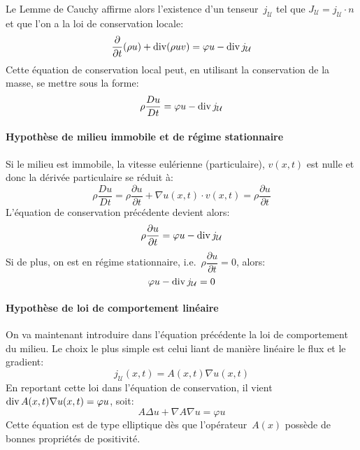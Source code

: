 Le Lemme de Cauchy affirme alors l'existence d'un tenseur~$j_{\mathcal{U}}$ tel que $J_{\mathcal{U}} = j_{\mathcal{U}}\cdot n$ et que l'on a la loi de conservation locale:
\begin{equation}\dfrac\partial{\partial t}(\rho u) + \operatorname{div} (\rho uv) = \varphi u-\operatorname{div} j_{\mathcal{U}}
\end{equation}
Cette équation de conservation local peut, en utilisant la conservation de la masse, se mettre sous la forme:
\begin{equation}
\rho \dfrac{Du}{Dt} = \varphi u-\operatorname{div} j_{\mathcal{U}}
\end{equation}

\medskip
\paragraph{Hypothèse de milieu immobile et de régime stationnaire}
Si le milieu est immobile, la vitesse eulérienne (particulaire), $v(x, t)$ est nulle et donc la dérivée particulaire se réduit à:
\begin{equation}\rho\dfrac{Du}{Dt}=\rho\dfrac{\partial u}{\partial t}+\nabla u(x,t)\cdot v(x,t)=\rho\dfrac{\partial u}{\partial t}\end{equation}
L'équation de conservation précédente devient alors:
\begin{equation}
\rho \dfrac{\partial u}{\partial t} = \varphi u-\operatorname{div} j_{\mathcal{U}}
\end{equation}
Si de plus, on est en régime stationnaire, i.e.~$\rho \dfrac{\partial u}{\partial t} =0$, alors:
\begin{equation}
\varphi u-\operatorname{div} j_{\mathcal{U}} =0
\end{equation}

\medskip
\paragraph{Hypothèse de loi de comportement linéaire}
On va maintenant introduire dans l'équation précédente la loi de comportement du milieu.
Le choix le plus simple est celui liant de manière linéaire le flux et le gradient:
\begin{equation}
j_{\mathcal{U}}(x,t)=A(x,t)\nabla u(x,t)
\end{equation}
En reportant cette loi dans l'équation de conservation, il vient~$\operatorname{div} A(x,t)\nabla u(x,t)=\varphi u$, soit:
\begin{equation}
A \Delta u + \nabla A \nabla u = \varphi u
\end{equation}
Cette équation est de type elliptique dès que l'opérateur~$A(x)$ possède de bonnes propriétés de positivité.

